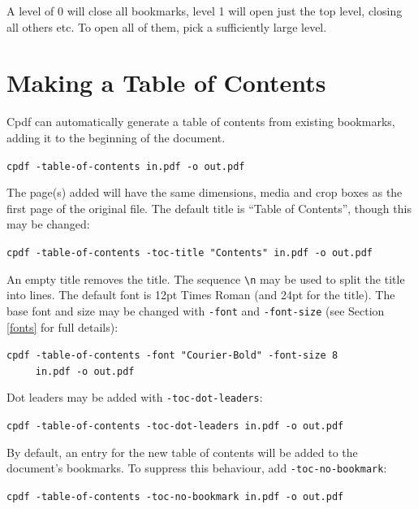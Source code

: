 \documentclass{book}
\begin{document}
\noindent A level of 0 will close all bookmarks, level 1 will open just the top level, closing all others etc. To open all of them, pick a sufficiently large level.


\section{Making a Table of Contents}

Cpdf can automatically generate a table of contents from existing bookmarks, adding it to the beginning of the document.

  \begin{framed}
   \noindent\small\verb!cpdf -table-of-contents in.pdf -o out.pdf!
  \end{framed}

\noindent The page(s) added will have the same dimensions, media and crop boxes as the first page of the original file. The default title is ``Table of Contents'', though this may be changed:

  \begin{framed}
   \noindent\small\verb!cpdf -table-of-contents -toc-title "Contents" in.pdf -o out.pdf!
  \end{framed}

\noindent An empty title removes the title. The sequence \texttt{\textbackslash n} may be used to split the title into lines. The default font is 12pt Times Roman (and 24pt for the title). The base font and size may be changed with \texttt{-font} and \texttt{-font-size} (see Section \ref{fonts} for full details):

  \begin{framed}
   \noindent\small\verb!cpdf -table-of-contents -font "Courier-Bold" -font-size 8!\\
   \noindent\small\verb!     in.pdf -o out.pdf!
  \end{framed}

\noindent Dot leaders may be added with \texttt{-toc-dot-leaders}:

  \begin{framed}
   \noindent\small\verb!cpdf -table-of-contents -toc-dot-leaders in.pdf -o out.pdf!
  \end{framed}

\noindent By default, an entry for the new table of contents will be added to the document's bookmarks. To suppress this behaviour, add \texttt{-toc-no-bookmark}:

  \begin{framed}
   \noindent\small\verb!cpdf -table-of-contents -toc-no-bookmark in.pdf -o out.pdf!
  \end{framed}
\end{document}
